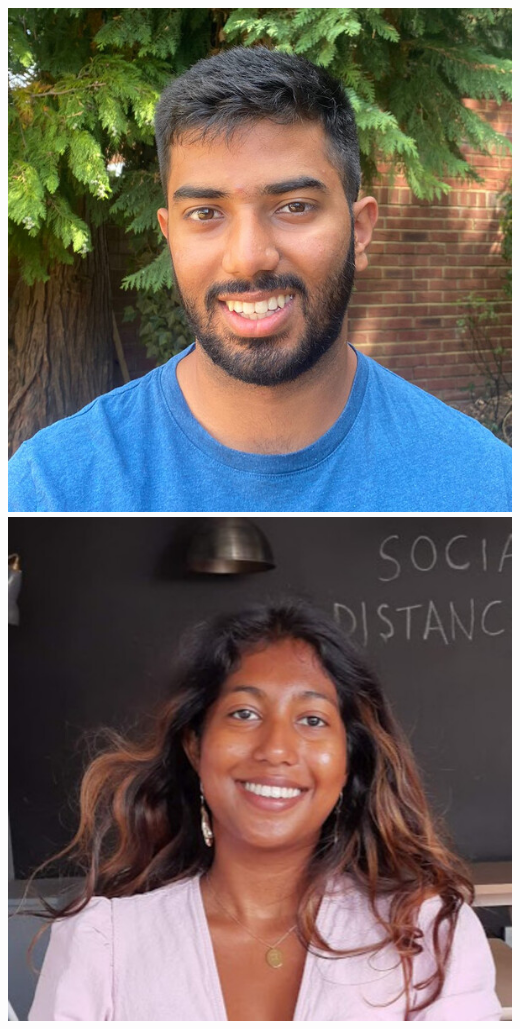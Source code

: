 \documentclass[aspectratio=169]{beamer}
\begin{document}
\begin{frame}
{        \includegraphics[width=0.08\textheight]{people/krish_nanavati.jpg}%
        \includegraphics[width=0.08\textheight]{people/metha_prathaban.jpg}%
}
\end{frame}
\end{document}
